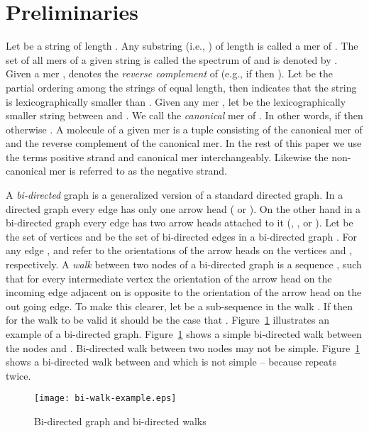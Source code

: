 \documentclass[11pt,conference,twocolumn]{IEEEtran}
\begin{document}
\section{Preliminaries}
\label{sec:prelim}
Let  be a string of length . Any substring  (i.e., ) of 
length  is called a mer of . The set of all mers of a given string  is called the spectrum of 
 and is denoted by . Given a mer ,  denotes the {\em reverse complement} of 
 (e.g., if  then ). Let  be the partial ordering among the strings of equal 
length, then  indicates that the string  is lexicographically smaller than . Given any mer , 
let  be the lexicographically smaller string between  and . We call 
 the {\em canonical} mer of . In other words, if  then  
otherwise . A molecule of a given mer  is a tuple  
consisting of the canonical mer of  and the reverse complement of the canonical mer. In the rest of
this paper we use the terms positive strand and canonical mer interchangeably. Likewise the non-canonical
mer is referred to as the negative strand.

A {\em bi-directed} graph is a generalized version of a standard directed graph. In a directed graph every 
edge has only one arrow head ( or ). On the other hand in a bi-directed graph 
every edge has two arrow heads attached to it (, , or ).
Let  be the set of vertices and 
 be the set of bi-directed edges 
in a bi-directed graph . For any edge ,
 and  refer to the orientations of the arrow heads on the vertices  and ,
respectively. A {\em walk}  between two 
nodes  of a bi-directed graph  is a sequence 
, such that for every intermediate 
vertex  the orientation of the arrow head on the incoming
edge adjacent on  is opposite to the orientation of the arrow head on the out going edge.
To make this clearer, let  be a sub-sequence in the walk .
If 
then for the walk to be valid it should be the case that . Figure~\ref{fig:bi-walk-example} 
illustrates an example of a bi-directed graph. Figure~\ref{fig:bi-walk-example} shows a simple
bi-directed walk between the nodes  and . Bi-directed walk between two nodes may not be simple.
Figure~\ref{fig:bi-walk-example} shows a bi-directed walk between  and  which is not 
simple -- because  repeats twice.
\begin{figure}
\begin{center}
\texttt{[image: bi-walk-example.eps]}
\end{center}
\caption{Bi-directed graph and bi-directed walks}
\label{fig:bi-walk-example}
\end{figure}
\end{document}
